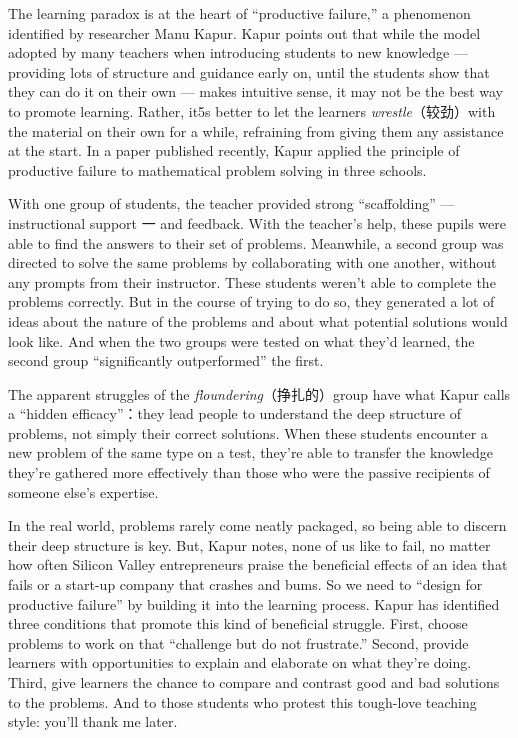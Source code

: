 \documentclass[UTF8,11pt]{ctexart}
\begin{document}
The learning paradox is at the heart of “productive failure,” a phenomenon identified by researcher Manu Kapur. Kapur points out that while the model adopted by many teachers when introducing students to new knowledge — providing lots of structure and guidance early on, until the students show that they can do it on their own — makes intuitive sense, it may not be the best way to promote learning. Rather, it5s better to let the learners\textit{ wrestle}（较劲）with the material on their own for a while, refraining from giving them any assistance at the start. In a paper published recently, Kapur applied the principle of productive failure to mathematical problem solving in three schools.


With one group of students, the teacher provided strong “scaffolding” — instructional support 一 and feedback. With the teacher’s help, these pupils were able to find the answers to their set of problems. Meanwhile, a second group was directed to solve the same problems by collaborating with one another, without any prompts from their instructor. These students weren’t able to complete the problems correctly. But in the course of trying to do so, they generated a lot of ideas about the nature of the problems and about what potential solutions would look like. And when the two groups were tested on what they’d learned, the second group “significantly outperformed” the first.


The apparent struggles of the\textit{ floundering}（挣扎的）group have what Kapur calls a “hidden efficacy”：they lead people to understand the deep structure of problems, not simply their correct solutions. When these students encounter a new problem of the same type on a test, they’re able to transfer the knowledge they’re gathered more effectively than those who were the passive recipients of someone else’s expertise.


In the real world, problems rarely come neatly packaged, so being able to discern their deep structure is key. But, Kapur notes, none of us like to fail, no matter how often Silicon Valley entrepreneurs praise the beneficial effects of an idea that fails or a start-up company that crashes and bums. So we need to “design for productive failure” by building it into the learning process. Kapur has identified three conditions that promote this kind of beneficial struggle. First, choose problems to work on that “challenge but do not frustrate.” Second, provide learners with opportunities to explain and elaborate on what they’re doing. Third, give learners the chance to compare and contrast good and bad solutions to the problems. And to those students who protest this tough-love teaching style: you’ll thank me later.
\end{document}
